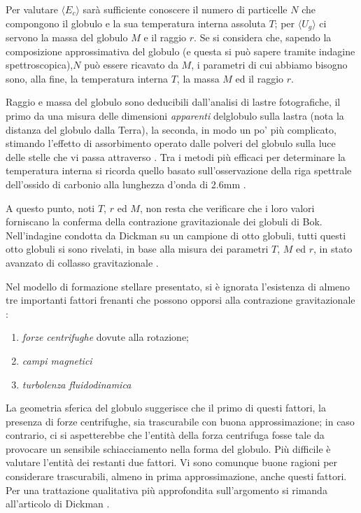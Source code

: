 Per valutare $\langle E_{c} \rangle$ sar\`{a} sufficiente conoscere il numero di
particelle $N$ che compongono il globulo e la sua temperatura interna assoluta
$T$; per $\langle U_{g} \rangle$ ci servono la massa del globulo $M$ e il raggio
$r$. Se si considera che, sapendo la composizione approssimativa del globulo (e
questa si pu\`o sapere tramite indagine spettroscopica),$N$ pu\`{o} essere ricavato da $M$, i parametri di cui abbiamo bisogno sono, alla fine, la temperatura interna $T$, la massa $M$ ed il raggio $r$.
\par
Raggio e massa del globulo sono deducibili dall'analisi di lastre fotografiche, il primo da una misura delle dimensioni \emph{apparenti} delglobulo sulla lastra (nota la distanza del globulo dalla Terra), la seconda, in modo un po' pi\`{u} complicato, stimando l'effetto di assorbimento operato dalle polveri del globulo sulla luce delle stelle che vi passa attraverso \Cite{dick}. Tra i metodi pi\`{u} efficaci per determinare la temperatura interna si ricorda quello basato sull'osservazione della riga spettrale dell'ossido di carbonio alla lunghezza d'onda di 2.6mm \Cite{dick}.
\par
A questo punto, noti $T$, $r$ ed $M$, non resta che verificare che i loro valori forniscano la conferma della contrazione gravitazionale dei globuli di Bok.
Nell'indagine condotta da Dickman su un campione di otto globuli, tutti questi otto globuli si sono rivelati, in base alla misura dei parametri $T$, $M$ ed $r$, in stato avanzato di collasso gravitazionale \Cite{dick}.
\par

\smallskip

Nel modello di formazione stellare presentato, si \`{e} ignorata l'esistenza di almeno tre importanti fattori frenanti che possono opporsi alla contrazione gravitazionale \Cite{dick}:
\begin{enumerate}
\item
\emph{forze centrifughe} dovute alla rotazione;
\item
\emph{campi magnetici}
\item
\emph{turbolenza fluidodinamica}
\end{enumerate}
La geometria sferica del globulo suggerisce che il primo di questi fattori, la presenza di forze centrifughe, sia trascurabile con buona approssimazione; in caso contrario, ci si aspetterebbe che l'entit\`{a} della forza centrifuga fosse tale da provocare un sensibile schiacciamento nella forma del globulo. Pi\`{u} difficile \`{e} valutare l'entit\`{a} dei restanti due fattori. Vi sono comunque buone ragioni per considerare trascurabili, almeno in prima approssimazione, anche questi fattori.
Per una trattazione qualitativa pi\`{u} approfondita sull'argomento si rimanda all'articolo di Dickman \Cite{dick}.
